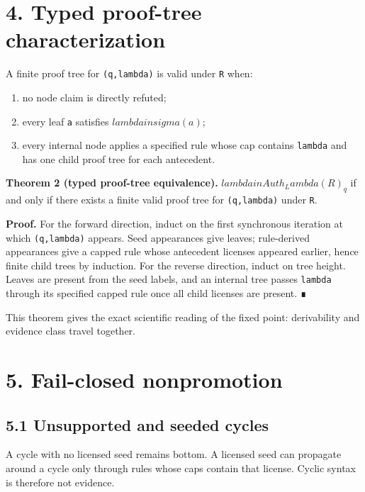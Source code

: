\documentclass[11pt]{article}
\begin{document}
\hypertarget{typed-proof-tree-characterization}{%
\section{4. Typed proof-tree
characterization}\label{typed-proof-tree-characterization}}

A finite proof tree for \texttt{(q,lambda)} is valid under \texttt{R}
when:

\begin{enumerate}
\def\labelenumi{\arabic{enumi}.}
\item
  no node claim is directly refuted;
\item
  every leaf \texttt{a} satisfies \(lambda in sigma(a)\);
\item
  every internal node applies a specified rule whose cap contains
  \texttt{lambda} and has one child proof tree for each antecedent.
\end{enumerate}

\textbf{Theorem 2 (typed proof-tree equivalence).}
\(lambda in Auth_Lambda(R)_q\) if and only if there exists a finite
valid proof tree for \texttt{(q,lambda)} under \texttt{R}.

\textbf{Proof.} For the forward direction, induct on the first
synchronous iteration at which \texttt{(q,lambda)} appears. Seed
appearances give leaves; rule-derived appearances give a capped rule
whose antecedent licenses appeared earlier, hence finite child trees by
induction. For the reverse direction, induct on tree height. Leaves are
present from the seed labels, and an internal tree passes
\texttt{lambda} through its specified capped rule once all child
licenses are present. ∎

This theorem gives the exact scientific reading of the fixed point:
derivability and evidence class travel together.

\hypertarget{fail-closed-nonpromotion}{%
\section{5. Fail-closed nonpromotion}\label{fail-closed-nonpromotion}}

\hypertarget{unsupported-and-seeded-cycles}{%
\subsection{5.1 Unsupported and seeded
cycles}\label{unsupported-and-seeded-cycles}}

A cycle with no licensed seed remains bottom. A licensed seed can
propagate around a cycle only through rules whose caps contain that
license. Cyclic syntax is therefore not evidence.
\end{document}
